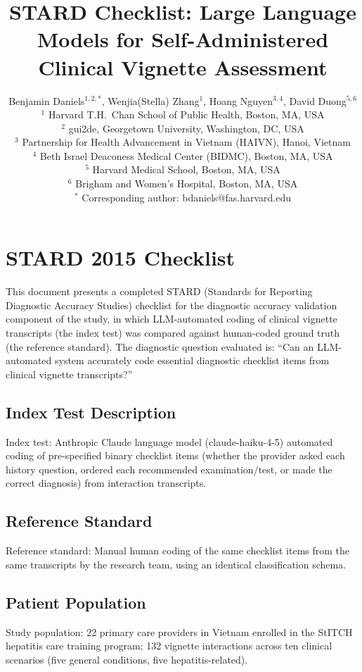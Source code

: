 \documentclass{article}
\title{STARD Checklist: Large Language Models for Self-Administered Clinical Vignette Assessment}
\author{
  Benjamin Daniels$^{1,2,\ast}$,
  Wenjia(Stella) Zhang$^{1}$,
  Hoang Nguyen$^{3,4}$,
  David Duong$^{5,6}$ \\[6pt]
  \small $^{1}$ Harvard T.H.\ Chan School of Public Health, Boston, MA, USA \\
  \small $^{2}$ gui2de, Georgetown University, Washington, DC, USA \\
  \small $^{3}$ Partnership for Health Advancement in Vietnam (HAIVN), Hanoi, Vietnam \\
  \small $^{4}$ Beth Israel Deaconess Medical Center (BIDMC), Boston, MA, USA \\
  \small $^{5}$ Harvard Medical School, Boston, MA, USA \\
  \small $^{6}$ Brigham and Women's Hospital, Boston, MA, USA \\[4pt]
  \small $^{\ast}$ Corresponding author: bdaniels@fas.harvard.edu
}
\date{}
\begin{document}
\maketitle

\section*{STARD 2015 Checklist}

This document presents a completed STARD (Standards for Reporting Diagnostic Accuracy Studies) checklist for the diagnostic accuracy validation component of the study, in which LLM-automated coding of clinical vignette transcripts (the index test) was compared against human-coded ground truth (the reference standard). The diagnostic question evaluated is: ``Can an LLM-automated system accurately code essential diagnostic checklist items from clinical vignette transcripts?''

\subsection*{Index Test Description}

Index test: Anthropic Claude language model (claude-haiku-4-5) automated coding of pre-specified binary checklist items (whether the provider asked each history question, ordered each recommended examination/test, or made the correct diagnosis) from interaction transcripts.

\subsection*{Reference Standard}

Reference standard: Manual human coding of the same checklist items from the same transcripts by the research team, using an identical classification schema.

\subsection*{Patient Population}

Study population: 22 primary care providers in Vietnam enrolled in the StITCH hepatitis care training program; 132 vignette interactions across ten clinical scenarios (five general conditions, five hepatitis-related).

\newpage
\end{document}
